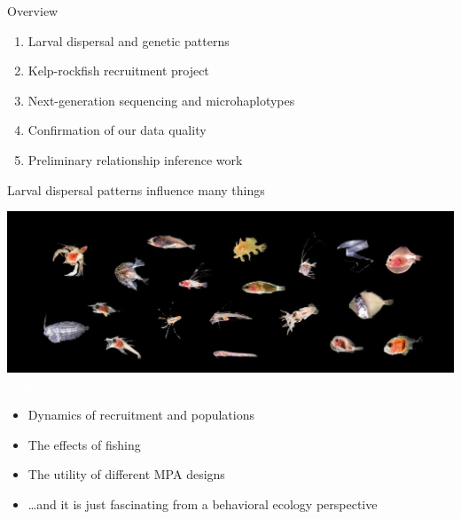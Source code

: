 \documentclass[letter,graphicx]{beamer}
\begin{document}
%



\begin{frame}{Overview}
\begin{enumerate}
\item Larval dispersal and genetic patterns
\item Kelp-rockfish recruitment project
\item Next-generation sequencing and microhaplotypes
\item Confirmation of our data quality
\item Preliminary relationship inference work
\end{enumerate}

\end{frame}







\begin{frame}{Larval dispersal patterns influence many things}

\includegraphics[width = \textwidth]{./figs/many_larvae.jpg}\\
{\tiny \vspace*{-4.5ex} \textcolor{white}{~rsmas.miami.edu}}

{\small
\begin{itemize}
\item Dynamics of recruitment and populations
\item The effects of fishing
\item The utility of different MPA designs
\item \ldots and it is just fascinating from a behavioral ecology perspective
\end{itemize}
}
\end{frame}
\end{document}

